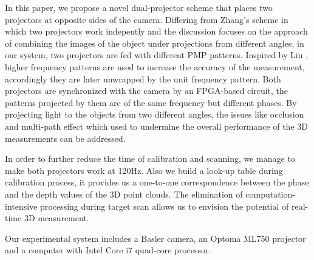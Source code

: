 \documentclass[10pt,letterpaper]{article}
\begin{document}
In this paper, we propose a novel dual-projector scheme that places two projectors at opposite sides of the camera. Differing from Zhang's scheme in which two projectors work indepently and the discussion focuses on the approach of combining the images of the object under projections from different angles, in our system, two projectors are fed with different PMP patterns. Inspired by Liu {\etal}, higher frequency patterns are used to increase the accuracy of the measurement, accordingly they are later unwrapped by the unit frequency pattern. Both projectors are synchronized with the camera by an FPGA-based circuit, the patterns projected by them are of the same frequency but different phases. By projecting light to the objects from two different angles, the issues like occlusion and multi-path effect which used to undermine the overall performance of the 3D measurements can be addressed.

In order to further reduce the time of calibration and scanning, we manage to make both projectors work at 120Hz. Also we build a look-up table during calibration process, it provides us a one-to-one correspondence between the phase and the depth values of the 3D point clouds. The elimination of computation-intensive processing during target scan allows us to envision the potential of real-time 3D measurement.

Our experimental system includes a Basler camera, an Optoma ML750 projector and a computer with Intel Core i7 quad-core processor.





\end{document}
